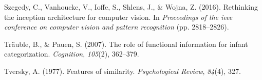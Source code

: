 \documentclass[10pt, letterpaper]{article}
\begin{document}
\hypertarget{ref-szegedy2016rethinking}{}
Szegedy, C., Vanhoucke, V., Ioffe, S., Shlens, J., \& Wojna, Z. (2016).
Rethinking the inception architecture for computer vision. In
\emph{Proceedings of the ieee conference on computer vision and pattern
recognition} (pp. 2818--2826).

\hypertarget{ref-trauble2007role}{}
Träuble, B., \& Pauen, S. (2007). The role of functional information for
infant categorization. \emph{Cognition}, \emph{105}(2), 362--379.

\hypertarget{ref-tversky1977features}{}
Tversky, A. (1977). Features of similarity. \emph{Psychological Review},
\emph{84}(4), 327.
\end{document}

